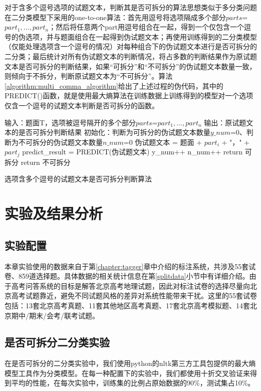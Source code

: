 \documentclass[master, winfont]{njuthesis}
\begin{document}
对于含多个逗号选项的试题文本，判断其是否可拆分的算法思想类似于多分类问题在二分类模型下采用的one-to-one算法：首先用逗号将选项隔成多个部分$parts$=${part_1, ..., part_n}$；然后将任意两个part用逗号组合在一起，得到一个仅包含一个逗号的伪选项，并与题面组合在一起得到伪试题文本；再使用训练得到的二分类模型（仅能处理选项含一个逗号的情况）对每种组合下的伪试题文本进行是否可拆分的二分类；最后统计对所有伪试题文本的判断情况，将占多数的判断结果作为原试题文本是否可拆分的判断结果，如果“可拆分”和“不可拆分”的伪试题文本数量一致，则倾向于不拆分，判断原试题文本为“不可拆分”。算法\ref{algorithm:multi_comma_algorithm}给出了上述过程的伪代码，其中的PREDICT()函数，就是使用最大熵算法在训练数据上训练得到的模型对一个选项仅含一个逗号的试题文本判断是否可拆分的函数。

\begin{algorithm}
\begin{algorithmic}[1]
\STATE 输入：题面T，选项被逗号隔开的多个部分$parts$=${part_1, ..., part_n}$
\STATE 输出：原试题文本的是否可拆分判断结果
\STATE 初始化：判断为可拆分的伪试题文本数量$y\_num$=0、判断为不可拆分的伪试题文本数量$n\_num$=0
		\STATE 伪试题文本 = 题面 + $part_i$ + "，" + $part_j$
		\STATE predict\_result = PREDICT(伪试题文本)
			\STATE y\_num++
		\ELSE
			\STATE n\_num++
		\ENDIF
	\ENDFOR
\ENDFOR
{}
	\STATE return 可拆分
\ELSE
	\STATE return 不可拆分
\ENDIF
\end{algorithmic}
\caption{\label{algorithm:multi_comma_algorithm}选项含多个逗号的试题文本是否可拆分判断算法}
\end{algorithm}

\section{实验及结果分析}
\subsection{实验配置}
本章实验使用的数据来自于第\ref{chapter:tagger}章中介绍的标注系统，共涉及55套试卷、859道选择题。具体数据的相关统计信息在第\ref{splitdata}小节中有详细介绍。由于高考问答系统的目标是解答北京高考地理试题，因此对标注试卷的选择尽量向北京高考试题靠近，避免不同试题风格的差异对系统性能带来干扰。这里的55套试卷包括：13套北京高考真题、11套其他地区高考真题、17套北京高考模拟题、14套北京期中/期末/会考/联考试题。

\subsection{是否可拆分二分类实验}
在是否可拆分的二分类实验中，我们使用python的nltk第三方工具包提供的最大熵模型工具作为分类模型。在每一种配置下的实验中，我们都使用十折交叉验证来得到平均的性能，在每次实验中，训练集的比例占原始数据的90\%，测试集占10\%。
\end{document}
